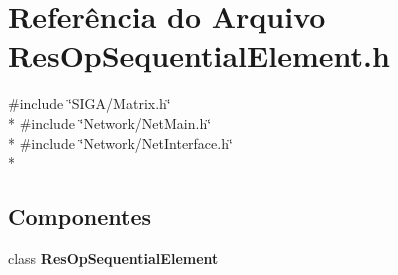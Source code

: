 \section{Referência do Arquivo Res\+Op\+Sequential\+Element.\+h}
\label{_res_op_sequential_element_8h}
{\ttfamily \#include \char`\"{}S\+I\+G\+A/\+Matrix.\+h\char`\"{}}\\*
{\ttfamily \#include \char`\"{}Network/\+Net\+Main.\+h\char`\"{}}\\*
{\ttfamily \#include \char`\"{}Network/\+Net\+Interface.\+h\char`\"{}}\\*
\subsection*{Componentes}
\begin{DoxyCompactItemize}
\item 
class {\bf Res\+Op\+Sequential\+Element}
\end{DoxyCompactItemize}

